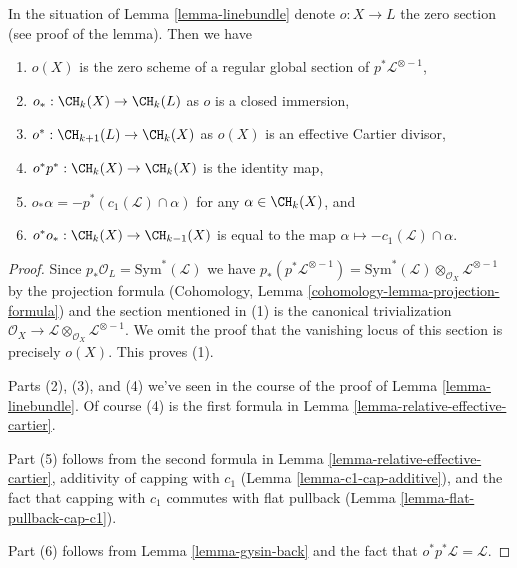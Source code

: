 \begin{lemma}
\label{lemma-linebundle-formulae}
In the situation of Lemma \ref{lemma-linebundle} denote $o : X \to L$
the zero section (see proof of the lemma). Then we have
\begin{enumerate}
\item $o(X)$ is the zero scheme of a regular global section of
$p^*\mathcal{L}^{\otimes -1}$,
\item $o_* : \CH_k(X) \to \CH_k(L)$ as $o$ is a closed immersion,
\item $o^* : \CH_{k + 1}(L) \to \CH_k(X)$ as $o(X)$
is an effective Cartier divisor,
\item $o^* p^* : \CH_k(X) \to \CH_k(X)$ is the identity map,
\item $o_*\alpha = - p^*(c_1(\mathcal{L}) \cap \alpha)$ for any
$\alpha \in \CH_k(X)$, and
\item $o^* o_* : \CH_k(X) \to \CH_{k - 1}(X)$ is equal to the map
$\alpha \mapsto - c_1(\mathcal{L}) \cap \alpha$.
\end{enumerate}
\end{lemma}

\begin{proof}
Since $p_*\mathcal{O}_L = \text{Sym}^*(\mathcal{L})$ we have
$p_*(p^*\mathcal{L}^{\otimes -1}) =
\text{Sym}^*(\mathcal{L}) \otimes_{\mathcal{O}_X} \mathcal{L}^{\otimes -1}$
by the projection formula
(Cohomology, Lemma \ref{cohomology-lemma-projection-formula})
and the section mentioned in (1) is
the canonical trivialization $\mathcal{O}_X \to
\mathcal{L} \otimes_{\mathcal{O}_X} \mathcal{L}^{\otimes -1}$.
We omit the proof that the vanishing locus of
this section is precisely $o(X)$. This proves (1).

\medskip\noindent
Parts (2), (3), and (4) we've seen in the course of the proof of
Lemma \ref{lemma-linebundle}. Of course (4) is the first
formula in Lemma \ref{lemma-relative-effective-cartier}.

\medskip\noindent
Part (5) follows from the second formula in
Lemma \ref{lemma-relative-effective-cartier},
additivity of capping with $c_1$ (Lemma \ref{lemma-c1-cap-additive}),
and the fact that capping with $c_1$ commutes with flat pullback
(Lemma \ref{lemma-flat-pullback-cap-c1}).

\medskip\noindent
Part (6) follows from Lemma \ref{lemma-gysin-back}
and the fact that $o^*p^*\mathcal{L} = \mathcal{L}$.
\end{proof}

